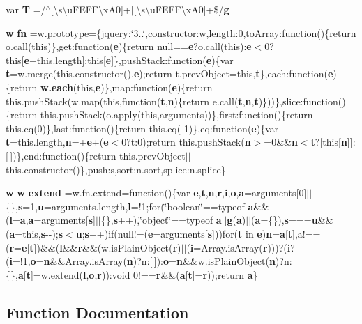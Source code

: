 \begin{DoxyCompactItemize}
var {\bf T} =/$^\wedge$[\textbackslash{}s\textbackslash{}u\+F\+E\+F\+F\textbackslash{}x\+A0]+$\vert$[\textbackslash{}s\textbackslash{}u\+F\+E\+F\+F\textbackslash{}x\+A0]+\$/{\bf g}
\item 
{\bf w} {\bf fn} =w.\+prototype=\{jquery\+:\char`\"{}3..\char`\"{},constructor\+:w,length\+:0,to\+Array\+:function()\{return o.\+call(this)\},get\+:function({\bf e})\{return null=={\bf e}?o.\+call(this)\+:{\bf e}$<$0?this[{\bf e}+this.\+length]\+:this[{\bf e}]\},push\+Stack\+:function({\bf e})\{var {\bf t}=w.\+merge(this.\+constructor(),{\bf e});return t.\+prev\+Object=this,{\bf t}\},each\+:function({\bf e})\{return {\bf w.\+each}(this,{\bf e})\},map\+:function({\bf e})\{return this.\+push\+Stack(w.\+map(this,function({\bf t},{\bf n})\{return e.\+call({\bf t},{\bf n},{\bf t})\}))\},slice\+:function()\{return this.\+push\+Stack(o.\+apply(this,arguments))\},first\+:function()\{return this.\+eq(0)\},last\+:function()\{return this.\+eq(-\/1)\},eq\+:function({\bf e})\{var {\bf t}=this.\+length,{\bf n}=+{\bf e}+({\bf e}$<$0?t\+:0);return this.\+push\+Stack({\bf n}$>$=0\&\&{\bf n}$<${\bf t}?[this[{\bf n}]]\+:[$\,$])\},end\+:function()\{return this.\+prev\+Object$\vert$$\vert$this.\+constructor()\},push\+:s,sort\+:n.\+sort,splice\+:n.\+splice\}
\item 
{\bf w} {\bf w} {\bf extend} =w.\+fn.\+extend=function()\{var {\bf e},{\bf t},{\bf n},{\bf r},{\bf i},{\bf o},{\bf a}=arguments[0]$\vert$$\vert$\{\},{\bf s}=1,{\bf u}=arguments.\+length,{\bf l}=!1;for(\char`\"{}boolean\char`\"{}==typeof {\bf a}\&\&({\bf l}={\bf a},{\bf a}=arguments[{\bf s}]$\vert$$\vert$\{\},{\bf s}++),\char`\"{}object\char`\"{}==typeof {\bf a}$\vert$$\vert${\bf g}({\bf a})$\vert$$\vert$({\bf a}=\{\}),{\bf s}==={\bf u}\&\&({\bf a}=this,{\bf s}-\/-\/);{\bf s}$<${\bf u};{\bf s}++)if(null!=({\bf e}=arguments[{\bf s}]))for({\bf t} in {\bf e}){\bf n}={\bf a}[{\bf t}],a!==({\bf r}={\bf e}[{\bf t}])\&\&({\bf l}\&\&{\bf r}\&\&(w.\+is\+Plain\+Object({\bf r})$\vert$$\vert$({\bf i}=Array.\+is\+Array({\bf r})))?({\bf i}?({\bf i}=!1,{\bf o}={\bf n}\&\&Array.\+is\+Array({\bf n})?n\+:[$\,$])\+:{\bf o}={\bf n}\&\&w.\+is\+Plain\+Object({\bf n})?n\+:\{\},{\bf a}[{\bf t}]=w.\+extend({\bf l},{\bf o},{\bf r}))\+:void 0!=={\bf r}\&\&({\bf a}[{\bf t}]={\bf r}));return {\bf a}\}
\end{DoxyCompactItemize}


\subsection{Function Documentation}
